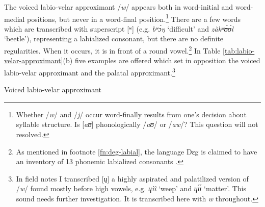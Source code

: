 The voiced labio-velar approximant /{\it w}/ appears both in word-initial and 
word-medial positions, but never in a word-final position.\footnote{Whether 
/{\it w}/ and /{\it j}/ occur word-finally results from one’s decision about 
syllable structure. Is [{\it aʊ}] phonologically /{\it aʊ}/ or /{\it aw}/? This 
question will not resolved.}  There are a few words which are transcribed with 
superscript [ʷ] (e.g. {\it  bʷɔ́ŋ} `difficult' and {\it  zàkʷʊ́ʊ́l} `beetle'),  
representing a labialized consonant, but there are  no definite regularities. 
When it  occurs, it is in front of a round vowel.\footnote{As mentioned in 
footnote \ref{fn:deg-labial}, the language Dɛg is claimed to have an inventory 
of 13 phonemic labialized consonants \citep[2]{Crou03}. } In Table 
\ref{tab:labio-velar-approximant}(b)  five examples are offered which set in 
opposition the voiced labio-velar approximant and the palatal 
approximant.\footnote{In field notes I transcribed [{\it ɥ}]  a highly 
aspirated and palatilized version of /{\it w}/ found mostly before high vowels, 
e.g. {\it ɥìì} `weep' and {\it ɥɪ́ɪ́}  `matter'. This sound needs  further 
investigation. It is transcribed here with {\it w} throughout.}



\begin{table}[!htb]
\small
\centering
\caption{Voiced labio-velar approximant\label{tab:labio-velar-approximant}}

\quad
{}


\end{table}


